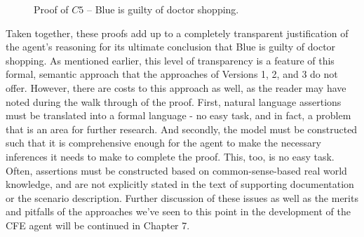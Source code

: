 \begin{figure}[h!] 
\vspace{6pt}
\centering
{}
\caption{Proof of $C5$ -- Blue is guilty of doctor shopping.}
\label{fig:proof_of_c5}
\end{figure}

Taken together, these proofs add up to a completely transparent justification of the agent's reasoning for its ultimate conclusion that Blue is guilty of doctor shopping.  As mentioned earlier, this level of transparency is a feature of this formal, semantic approach that the approaches of Versions 1, 2, and 3 do not offer.  However, there are costs to this approach as well, as the reader may have noted during the walk through of the proof.  First, natural language assertions must be translated into a formal language - no easy task, and in fact, a problem that is an area for further research.  And secondly, the model must be constructed such that it is comprehensive enough for the agent to make the necessary inferences it needs to make to complete the proof.  This, too, is no easy task.  Often, assertions must be constructed based on common-sense-based real world knowledge, and are not explicitly stated in the text of supporting documentation or the scenario description.  Further discussion of these issues as well as the merits and pitfalls of the approaches we've seen to this point in the development of the CFE agent will be continued in Chapter 7.



